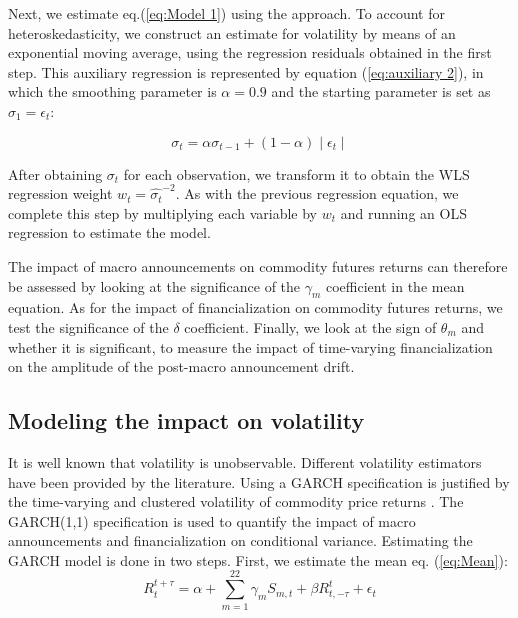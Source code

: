 \documentclass[12pt]{article}
\begin{document}
Next, we estimate eq.(\ref{eq:Model 1}) using the \citet*{kurov2019price} approach. To account for heteroskedasticity, we construct an estimate for volatility by means of an exponential moving average, using the regression residuals obtained in the first step. This auxiliary regression is represented by equation (\ref{eq:auxiliary 2}), in which the smoothing parameter is $\alpha=0.9$ and the starting parameter is set as $\sigma_1=\epsilon_t$:

\begin{equation}\label{eq:auxiliary 2}
\sigma_t=\alpha \sigma_{t-1}+(1-\alpha) \mid \epsilon_t \mid 
\end{equation} 

After obtaining  $\sigma_t$ for each observation, we transform it to obtain the WLS regression weight $w_t = \hat{\sigma_t}^{-2}$.
As with the previous regression equation, we complete this step by multiplying each variable by  $w_t$ and running an OLS regression to estimate the model.%

 The impact of macro announcements on commodity futures returns  can therefore be assessed by looking at the significance of the $\gamma_m$ coefficient  in the mean equation. As for the impact of financialization on commodity futures returns, we test the significance of the $\delta$ coefficient. Finally, we look at the sign of $\theta_m$ and whether it is significant,  to measure the impact of time-varying financialization on the amplitude of the post-macro announcement drift.
 
\subsection{Modeling the impact on volatility}\label{variance}

It is well known that volatility is unobservable. Different volatility estimators have been provided by the literature. 
Using a GARCH specification is justified by the time-varying and clustered volatility of commodity price returns  \citep*[see e.g.,][]{hammoudeh2008metal}.
The GARCH(1,1) specification is used to quantify the impact of macro announcements and financialization on conditional variance. Estimating the GARCH model is done in two steps. First, we estimate the mean eq. (\ref{eq:Mean}):
\begin{equation}\label{eq:Mean}
R_{t}^{t+\tau}=\alpha+\sum_{m=1}^{22} \gamma_m S_{m,t}+\beta R_{t,-\tau}^{t}+\epsilon_{t}
\end{equation}
\end{document}

